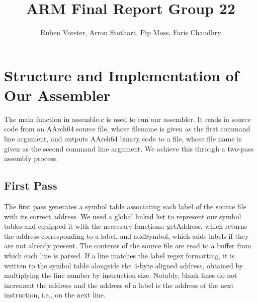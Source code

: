 \documentclass[11pt]{article}
\date{}
\begin{document}
\title{ARM Final Report Group 22}
\author{Ruben Vorster, Arron Stothart, Pip Moss, Faris Chaudhry}

\maketitle

\section{Structure and Implementation of Our Assembler}
The main function in assemble.c is used to run our assembler. It reads in source code from an AArch64 source file, whose filename is given as the first command line argument, and outputs AArch64 binary code to a file, whose file name is given as the second command line argument. We achieve this through a two-pass assembly process. 
\subsection{First Pass}
The first pass generates a symbol table associating each label of the source file with its correct address. We used a global linked list to represent our symbol tables and equipped it with the necessary functions: getAddress, which returns the address corresponding to a label, and addSymbol, which adds labels if they are not already present. The contents of the source file are read to a buffer from which each line is parsed. If a line matches the label regex formatting, it is written to the symbol table alongside the 4-byte aligned address, obtained by multiplying the line number by instruction size. Notably, blank lines do not increment the address and the address of a label is the address of the next instruction, i.e., on the next line.  
\end{document}

